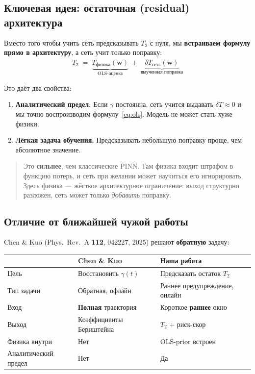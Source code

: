 \documentclass[12pt,a4paper]{article}
\begin{document}
\subsection{Ключевая идея: остаточная (residual) архитектура}

Вместо того чтобы учить сеть предсказывать $T_2$ с нуля, мы \textbf{встраиваем
формулу прямо в архитектуру}, а сеть учит только поправку:
\begin{equation}
  \widehat{T}_2 \;=\;
  \underbrace{T_{\text{физика}}(\mathbf{w})}_{\text{OLS-оценка}}
  \;+\;
  \underbrace{\delta T_{\text{сеть}}(\mathbf{w})}_{\text{выученная поправка}}
  \label{eq:residual}
\end{equation}

Это даёт два свойства:

\begin{enumerate}
  \item \textbf{Аналитический предел.} Если $\gamma$ постоянна, сеть учится
        выдавать $\delta T\approx 0$ и мы точно воспроизводим
        формулу~\eqref{eq:ols}. Модель не может стать хуже физики.
  \item \textbf{Лёгкая задача обучения.} Предсказывать небольшую поправку
        проще, чем абсолютное значение.
\end{enumerate}

\begin{quote}
Это \textbf{сильнее}, чем классические PINN. Там физика входит штрафом в
функцию потерь, и сеть при желании может научиться его игнорировать. Здесь
физика — жёсткое архитектурное ограничение: выход структурно разложен, сеть
может только \emph{добавить} поправку.
\end{quote}

\subsection{Отличие от ближайшей чужой работы}

Chen \& Kuo (Phys.\ Rev.\ A \textbf{112}, 042227, 2025) решают
\textbf{обратную} задачу:

\begin{center}
\begin{tabular}{@{}p{3.6cm}p{4.6cm}p{4.6cm}@{}}
\toprule
 & Chen \& Kuo & Наша работа \\
\midrule
Цель & Восстановить $\gamma(t)$ & Предсказать остаток $T_2$ \\
Тип задачи & Обратная, офлайн & Раннее предупреждение, онлайн \\
Вход & \textbf{Полная} траектория & Короткое \textbf{раннее} окно \\
Выход & Коэффициенты Бернштейна & $T_2$ + риск-скор \\
Физика внутри & Нет & OLS-prior встроен \\
Аналитический предел & Нет & Да \\
\bottomrule
\end{tabular}
\end{center}
\end{document}
